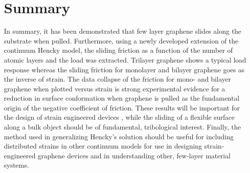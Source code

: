 \section{Summary}
In summary, it has been demonstrated that few layer graphene slides along the substrate when pulled.
Furthermore, using a newly developed extension of the continuum Hencky model, the sliding friction as a function of the number of atomic layers and the load was extracted.
Trilayer graphene shows a typical load response whereas the sliding friction for monolayer and bilayer graphene goes as the inverse of strain.
The data collapse of the friction for mono- and bilayer graphene when plotted versus strain is strong experimental evidence for a reduction in surface conformation when graphene is pulled as the fundamental origin of the negative coefficient of friction.
These results will be important for the design of strain engineered devices \cite{Pereira2009a}, while the sliding of a flexible surface along a bulk object should be of fundamental, tribological interest.
Finally, the method used in generalizing Hencky's solution should be useful for including distributed strains in other continuum models for use in designing strain-engineered graphene devices and in understanding other, few-layer material systems.